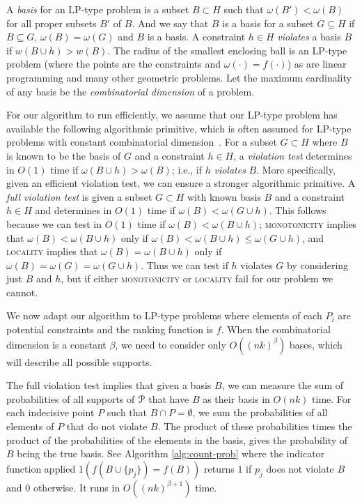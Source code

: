 \documentclass{journal}
\newcommand{\Eu}[1]{\ensuremath{\EuScript{#1}}}
\newcommand{\psets}{supports\xspace}
\begin{document}
A \emph{basis} for an LP-type problem is a subset $B \subset H$ such that $\omega(B') < \omega(B)$ for all proper subsets $B'$ of $B$.  And we say that $B$ is a basis for a subset $G \subseteq H$ if $B \subseteq G$, $\omega(B) = \omega(G)$ and $B$ is a basis.  A constraint $h \in H$ \emph{violates} a basis $B$ if $w(B \cup h) > w(B)$.
The radius of the smallest enclosing ball is an LP-type problem (where the points are the constraints and $\omega(\cdot) = f(\cdot)$) as are linear programming and many other geometric problems.
Let the maximum cardinality of any basis be the \emph{combinatorial dimension} of a problem.  

For our algorithm to run efficiently, we assume that our LP-type problem has available the following algorithmic primitive, which is often assumed for LP-type problems with constant combinatorial dimension~\cite{SW92}.  For a subset $G \subset H$ where $B$ is known to be the basis of $G$ and a constraint $h \in H$, a \emph{violation test} determines in $O(1)$ time if $\omega(B \cup h) > \omega(B)$; i.e., if $h$ \emph{violates} $B$.  More specifically, given an efficient violation test, we can ensure a stronger algorithmic primitive.  A \emph{full violation test} is given a subset $G \subset H$ with known basis $B$ and a constraint $h \in H$ and determines in $O(1)$ time if $\omega(B) < \omega(G \cup h)$.  This follows because we can test in $O(1)$ time if $\omega(B) < \omega(B \cup h)$; \textsc{monotonicity} implies that $\omega(B) < \omega(B \cup h)$ only if $\omega(B) < \omega(B \cup h) \leq \omega(G \cup h)$, and \textsc{locality} implies that $\omega(B) = \omega(B \cup h)$ only if $\omega(B) = \omega(G) = \omega(G \cup h)$.
Thus we can test if $h$ violates $G$ by considering just $B$ and $h$, but if either \textsc{monotonicity} or \textsc{locality} fail for our problem we cannot.

We now adapt our algorithm to LP-type problems where elements of each $P_i$ are potential constraints and the ranking function is $f$.
When the combinatorial dimension is a constant $\beta$, we need to consider only $O((nk)^\beta)$ bases, which will describe all possible supports.

The full violation test implies that given a basis $B$, we can measure the sum of probabilities of all \psets of $\Eu P$ that have $B$ as their basis in $O(nk)$ time.  For each indecisive point $P$ such that $B \cap P = \emptyset$, we sum the probabilities of all elements of $P$ that do not violate $B$.  The product of these probabilities times the product of the probabilities of the elements in the basis, gives the probability of $B$ being the true basis.  See Algorithm \ref{alg:count-prob} where the indicator function applied $1(f(B \cup \{p_j\}) = f(B))$ returns $1$ if $p_j$ does not violate $B$ and $0$ otherwise.
It runs in $O((nk)^{\beta+1})$ time.
\end{document}
